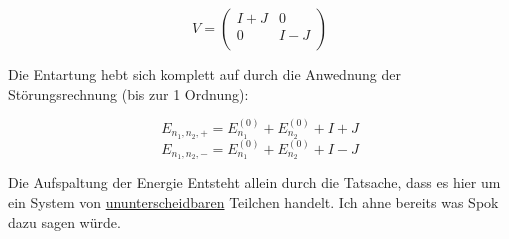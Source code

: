 \[V =  \begin{pmatrix} I+J & 0 \\
 0 & I-J \\
\end{pmatrix} \]

Die Entartung hebt sich komplett auf durch die Anwednung der Störungsrechnung (bis zur 1 Ordnung):


\[E_{n_1,n_2,+} = E_{n_1}^{(0)}+E_{n_2}^{(0)}+I+J\]
\[E_{n_1,n_2,-} = E_{n_1}^{(0)}+E_{n_2}^{(0)}+I-J\]


Die Aufspaltung der Energie Entsteht allein durch die Tatsache, dass es hier um ein System von \underline{ununterscheidbaren} Teilchen handelt. Ich ahne bereits was Spok dazu sagen würde.





 